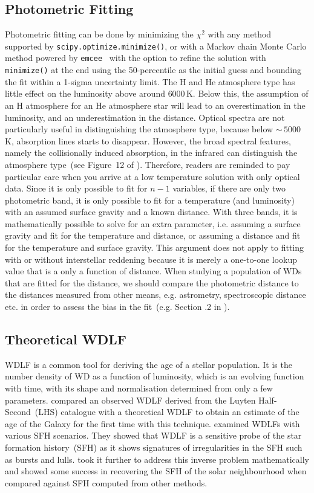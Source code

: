 \documentclass[fleqn,usenatbib]{rasti}
\begin{document}
\subsection{Photometric Fitting}
Photometric fitting can be done by minimizing the $\chi^2$ with any method
supported by \verb+scipy.optimize.minimize()+, or with a Markov chain Monte
Carlo method powered by \texttt{emcee}~\citep{2013PASP..125..306F} with the
option to refine the solution with \verb+minimize()+ at the end using the
50-percentile as the initial guess and bounding the fit within a 1-sigma
uncertainty limit. The H and He atmosphere type has little effect on the
luminosity above around $6000$\,K. Below this, the assumption of an H
atmosphere for an He atmosphere star will lead to an overestimation in the
luminosity, and an underestimation in the distance. Optical spectra are
not particularly useful in distinguishing the atmosphere type, because below
$\sim$\,$5000$\,K, absorption lines starts to disappear. However, the
broad spectral features, namely the collisionally induced absorption, in the
infrared can distinguish the atmosphere type~(see Figure~12 of
\citealt{2017ApJ...848...36B}). Therefore, readers are reminded to pay
particular care when you arrive at a low temperature solution with only
optical data. Since it is only possible to fit for $n-1$ variables, if there
are only two photometric band, it is only possible to fit for a temperature
(and luminosity) with an assumed surface gravity and a known distance. With
three bands, it is mathematically possible to solve for an extra parameter,
i.e. assuming a surface gravity and fit for the temperature and distance,
or assuming a distance and fit for the temperature and surface gravity.
This argument does not apply to fitting with or without interstellar reddening
because it is merely a one-to-one lookup value that is a only a function of
distance. When studying a population of WDs that are fitted for the
distance, we should compare the photometric distance to the distances measured
from other means, e.g. astrometry, spectroscopic distance etc. in order to
assess the bias in the fit~(e.g. Section .2
in \citealt{2011MNRAS.417...93R}).

\subsection{Theoretical WDLF}
WDLF is a common tool for deriving the age of a stellar population. It is the
number density of WD as a function of luminosity, which is an evolving function
with time, with its shape and normalisation determined from only a few
parameters. \citet{1987ApJ...315L..77W} compared an observed WDLF derived from
the Luyten Half-Second~(LHS) catalogue with a theoretical WDLF to obtain an
estimate of the age of the Galaxy for the first time with this technique.
\citet{1990ApJ...352..605N} examined WDLFs with various SFH scenarios. They
showed that WDLF is a sensitive probe of the star formation history~(SFH) as
it shows signatures of irregularities in the SFH such as bursts and lulls.
\citet{2013MNRAS.434.1549R} took it further to address this inverse problem
mathematically and showed some success in recovering the SFH of the solar
neighbourhood when compared against SFH computed from other methods.
\end{document}
